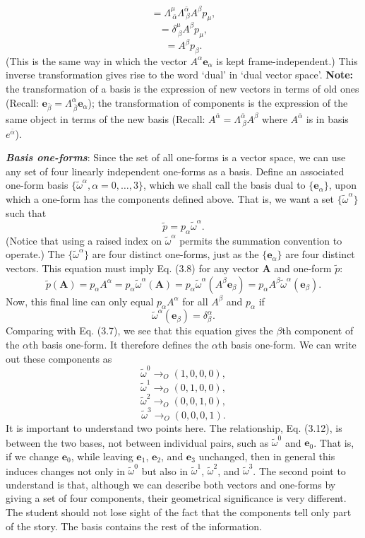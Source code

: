 \documentclass[12pt]{book}
\begin{document}
    \[
    = \Lambda^\mu_{\ \bar{\alpha}} \Lambda^{\bar{\alpha}}_{\ \beta} A^\beta p_\mu, \tag{3.10b}
    \]
    \[
    = \delta^\mu_{\ \beta} A^\beta p_\mu, \tag{3.10c}
    \]
    \[
    = A^\beta p_\beta. \tag{3.10d}
    \]
    (This is the same way in which the vector \(A^\alpha \mathbf{e}_\alpha\) is kept frame-independent.) This inverse transformation gives rise to the word ‘dual’ in ‘dual vector space’. \textbf{Note:} the transformation of a basis is the expression of new vectors in terms of old ones (Recall: \(\mathbf{e}_{\bar{\beta}} = \Lambda^\alpha_{\ \bar{\beta}} \mathbf{e}_\alpha\)); the transformation of components is the expression of the same object in terms of the new basis (Recall: \(A^\bar{\alpha}=\Lambda^{\bar{\alpha}}_{\ \beta} A^\beta\) where $A^\bar{\alpha}$ is in basis $e^\bar{\alpha}$).

    \textit{\textbf{Basis one-forms}}: Since the set of all one-forms is a vector space, we can use any set of four linearly independent one-forms as a basis. Define an associated one-form basis \(\{ \tilde{\omega}^\alpha, \alpha = 0, \dots, 3 \}\), which we shall call the basis dual to \(\{\mathbf{e}_\alpha\}\), upon which a one-form has the components defined above. That is, we want a set \(\{\tilde{\omega}^\alpha\}\) such that    \[
    \tilde{p} = p_\alpha \tilde{\omega}^\alpha. \tag{3.11}
    \]
    (Notice that using a raised index on \(\tilde{\omega}^\alpha\) permits the summation convention to operate.) The \(\{\tilde{\omega}^\alpha\}\) are four distinct one-forms, just as the \(\{\mathbf{e}_\alpha\}\) are four distinct vectors. This equation must imply Eq. (3.8) for any vector \(\mathbf{A}\) and one-form \(\tilde{p}\):
    \[
    \tilde{p}(\mathbf{A}) = p_\alpha A^\alpha= p_\alpha \tilde{\omega}^\alpha(\mathbf{A})
    = p_\alpha \tilde{\omega}^\alpha(A^\beta \mathbf{e}_\beta)
    = p_\alpha A^\beta \tilde{\omega}^\alpha(\mathbf{e}_\beta).
    \]
    Now, this final line can only equal \(p_\alpha A^\alpha\) for all \(A^\beta\) and \(p_\alpha\) if
    \[
    \tilde{\omega}^\alpha(\mathbf{e}_\beta) = \delta^\alpha_\beta. \tag{3.12}
    \]
    Comparing with Eq. (3.7), we see that this equation gives the \(\beta\)th component of the \(\alpha\)th basis one-form. It therefore defines the \(\alpha\)th basis one-form. We can write out these components as
    \[
    \tilde{\omega}^0 \rightarrow_O (1, 0, 0, 0),
    \]
    \[
    \tilde{\omega}^1 \rightarrow_O (0, 1, 0, 0),
    \]
    \[
    \tilde{\omega}^2 \rightarrow_O (0, 0, 1, 0),
    \]
    \[
    \tilde{\omega}^3 \rightarrow_O (0, 0, 0, 1).
    \]
    It is important to understand two points here. The relationship, Eq. (3.12), is between the two bases, not between individual pairs, such as \(\tilde{\omega}^0\) and \(\mathbf{e}_0\). That is, if we change \(\mathbf{e}_0\), while leaving \(\mathbf{e}_1\), \(\mathbf{e}_2\), and \(\mathbf{e}_3\) unchanged, then in general this induces changes not only in \(\tilde{\omega}^0\) but also in \(\tilde{\omega}^1\), \(\tilde{\omega}^2\), and \(\tilde{\omega}^3\). The second point to understand is that, although we can describe both vectors and one-forms by giving a set of four components, their geometrical significance is very different. The student should not lose sight of the fact that the components tell only part of the story. The basis contains the rest of the information.
\end{document}
